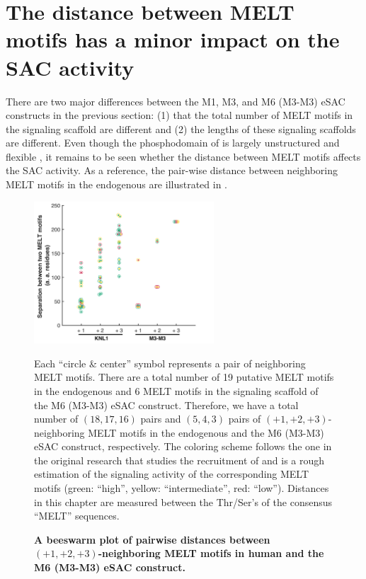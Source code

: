 \section{The distance between MELT motifs has a minor impact on the SAC activity}
There are two major differences between the M1, M3, and M6 (M3-M3) eSAC constructs in the previous section: (1) that the total number of MELT motifs in the signaling scaffold are different and (2) the lengths of these signaling scaffolds are different. Even though the phosphodomain of  is largely unstructured and flexible \cite{UnstructuredKNL1}, it remains to be seen whether the distance between MELT motifs affects the SAC activity. As a reference, the pair-wise distance between neighboring MELT motifs in the endogenous  are illustrated in .

\begin{figure}
    \centering
    \includegraphics[width=0.6\textwidth]{chapters/figures/MELTSeparationColorCodedBeeSwarmPlot.pdf}
    \caption{\textbf{A beeswarm plot of pairwise distances between $(+1, +2, +3)$-neighboring MELT motifs in human  and the M6 (M3-M3) eSAC construct.}}
    \noindent\justifying Each ``circle \& center'' symbol represents a pair of neighboring MELT motifs. There are a total number of 19 putative MELT motifs in the endogenous  and 6 MELT motifs in the signaling scaffold of the M6 (M3-M3) eSAC construct. Therefore, we have a total number of $(18, 17, 16)$ pairs and $(5, 4, 3)$ pairs of $(+1, +2, +3)$-neighboring MELT motifs in the endogenous  and the M6 (M3-M3) eSAC construct, respectively. The coloring scheme follows the one in the original research \cite{MELTActivity} that studies the recruitment of  and is a rough estimation of the signaling activity of the corresponding MELT motifs (green: ``high'', yellow: ``intermediate'', red: ``low''). Distances in this chapter are measured between the Thr/Ser's of the consensus ``MELT'' sequences.
    \label{PairwiseDistancesBetweenNeighboringMELTs}
\end{figure}

